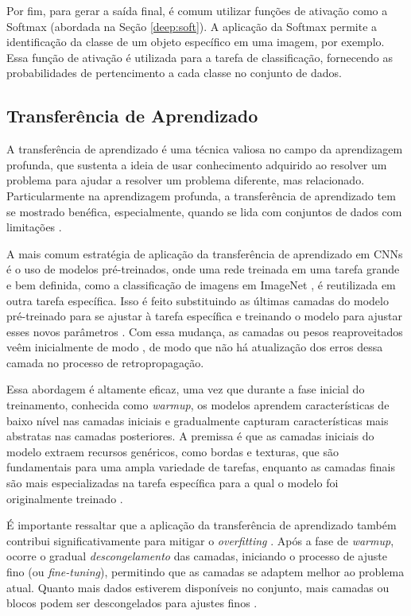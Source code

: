 Por fim, para gerar a saída final, é comum utilizar funções de ativação como a Softmax (abordada na Seção \ref{deep:soft}). A aplicação da Softmax permite a identificação da classe de um objeto específico em uma imagem, por exemplo. Essa função de ativação é utilizada para a tarefa de classificação, fornecendo as probabilidades de pertencimento a cada classe no conjunto de dados.

\subsection{Transferência de Aprendizado}
\label{cnn:transfer}

A transferência de aprendizado é uma técnica valiosa no campo da aprendizagem profunda, que sustenta a ideia de usar conhecimento adquirido ao resolver um problema para ajudar a resolver um problema diferente, mas relacionado. Particularmente na aprendizagem profunda, a transferência de aprendizado tem se mostrado benéfica, especialmente, quando se lida com conjuntos de dados com limitações \citep{Pan2010}.

A mais comum estratégia de aplicação da transferência de aprendizado em CNNs é o uso de modelos pré-treinados, onde uma rede treinada em uma tarefa grande e bem definida, como a classificação de imagens em ImageNet \citep{Deng2009ImageNet:Database}, é reutilizada em outra tarefa específica. Isso é feito substituindo as últimas camadas do modelo pré-treinado para se ajustar à tarefa específica e treinando o modelo para ajustar esses novos parâmetros \citep{Yosinski2014HowNetworks}. Com essa mudança, as camadas ou pesos reaproveitados veêm inicialmente de modo , de modo que não há atualização dos erros dessa camada no processo de retropropagação.

Essa abordagem é altamente eficaz, uma vez que durante a fase inicial do treinamento, conhecida como \textit{warmup}, os modelos aprendem características de baixo nível nas camadas iniciais e gradualmente capturam características mais abstratas nas camadas posteriores. A premissa é que as camadas iniciais do modelo extraem recursos genéricos, como bordas e texturas, que são fundamentais para uma ampla variedade de tarefas, enquanto as camadas finais são mais especializadas na tarefa específica para a qual o modelo foi originalmente treinado \citep{Yosinski2014HowNetworks}.

É importante ressaltar que a aplicação da transferência de aprendizado também contribui significativamente para mitigar o \textit{overfitting} \citep{Geron2017Hands-onSystems}. Após a fase de \textit{warmup}, ocorre o gradual \textit{descongelamento} das camadas, iniciando o processo de ajuste fino (ou \textit{fine-tuning}), permitindo que as camadas se adaptem melhor ao problema atual. Quanto mais dados estiverem disponíveis no conjunto, mais camadas ou blocos podem ser descongelados para ajustes finos \citep{Geron2017Hands-onSystems}.

